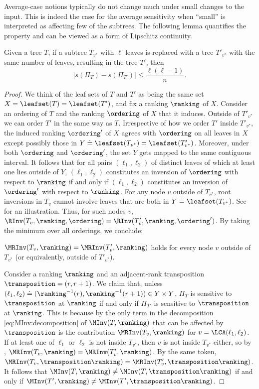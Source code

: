 \documentclass{toc}
\begin{document}
Average-case notions typically do not change much under small changes to the input. This is indeed the case for the average sensitivity when ``small'' is interpreted as affecting few of the subtrees. The following lemma quantifies the property and can be viewed as a form of Lipschitz continuity.
\begin{lemma}
    \label{lemma:sensitivity:lipschitz}    
    Given a tree $T$, if a subtree $T_{v^*}$ with $\ell$ leaves is replaced with a tree $T'_{v^*}$ with the same number of leaves, resulting in the tree $T'$, then
    \[|s(\Pi_T)-s(\Pi_{T'})| \le \frac{\ell(\ell-1)}{n}. \]
\end{lemma}
\begin{proof}
We think of the leaf sets of $T$ and $T'$ as being the same set $X=\leafset(T)=\leafset(T')$, and fix a ranking $\ranking$ of $X$. Consider an ordering of $T$ and the ranking $\ordering$ of $X$ that it induces. Outside of $T'_{v^*}$ we can order $T'$ in the same way as $T$. Irrespective of how we order $T'$ inside $T'_{v^*}$, the induced ranking $\ordering'$ of $X$ agrees with $\ordering$ on all leaves in $X$ except possibly those in $Y \doteq \leafset(T_{v^*})=\leafset(T'_{v^*})$. Moreover, under both $\ordering$ and $\ordering'$, the set $Y$ gets mapped to the same contiguous interval. It follows that for all pairs $(\ell_1,\ell_2)$ of distinct leaves of which at least one lies outside of $Y$, $(\ell_1,\ell_2)$ constitutes an inversion of $\ordering$ with respect to $\ranking$ if and only if $(\ell_1,\ell_2)$ constitutes an inversion of $\ordering'$ with respect to $\ranking$. For any node $v$ outside of $T_{v^*}$, root inversions in $T_v$ cannot involve leaves that are both in $Y \doteq \leafset(T_{v^*})$. See  for an illustration. Thus, for such nodes $v$, $\RInv(T_v,\ranking,\ordering) = \RInv(T'_v,\ranking,\ordering')$. By taking the minimum over all orderings, we conclude:
\begin{claim}\label{claim:root:insensitive}
$\MRInv(T_v,\ranking) = \MRInv(T'_v,\ranking)$ holds for every node $v$ outside of $T_{v^*}$ (or equivalently, outside of $T'_{v^*}$).
\end{claim}

Consider a ranking $\ranking$ and an adjacent-rank transposition $\transposition=(r,r+1)$. We claim that, unless $(\ell_1,\ell_2) \doteq (\ranking^{-1}(r),\ranking^{-1}(r+1)) \in Y \times Y$, $\Pi_T$ is sensitive to $\transposition$ at $\ranking$ if and only if $\Pi_{T'}$ is sensitive to $\transposition$ at $\ranking$. This is because by  the only term in the decomposition \eqref{eq:MInv:decomposition} of $\MInv(T,\ranking)$ that can be affected by $\transposition$ is the contribution $\MRInv(T_v,\ranking)$ for $v = \LCA(\ell_1,\ell_2)$. If at least one of $\ell_1$ or $\ell_2$ is not inside $T_{v^*}$, then $v$ is not inside $T_{v^*}$ either, so by , $\MRInv(T_v,\ranking) = \MRInv(T'_v,\ranking)$. By the same token, $\MRInv(T_v,\transposition \ranking) = \MRInv(T'_v,\transposition \ranking)$. It follows that $\MInv(T,\ranking) \ne \MInv(T,\transposition \ranking)$ if and only if $\MInv(T',\ranking) \ne \MInv(T',\transposition \ranking)$.


\end{proof}
\end{document}
